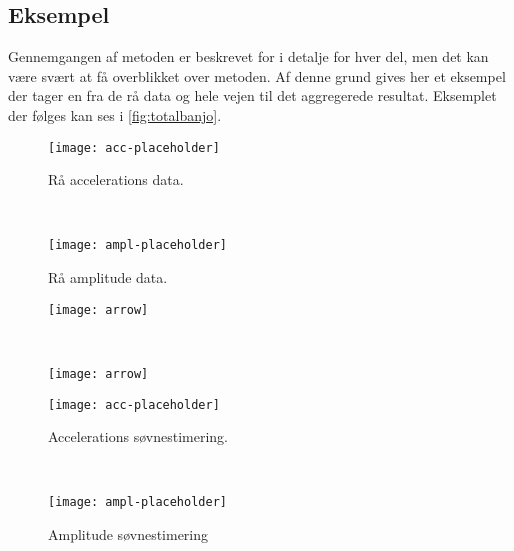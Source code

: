 \subsection{Eksempel}
Gennemgangen af metoden er beskrevet for i detalje for hver del, men det kan være svært at få overblikket over metoden.
Af denne grund gives her et eksempel der tager en fra de rå data og hele vejen til det aggregerede resultat.
Eksemplet der følges kan ses i \cref{fig:totalbanjo}.
\begin{sidewaysfigure}
	\begin{minipage}{0.2\textwidth}
		\begin{subfigure}{\linewidth}
			\centering
			\texttt{[image: acc-placeholder]}
			\caption{Rå accelerations data.}\label{fig:rawaccplot}
		\end{subfigure}\\[5ex]
		\begin{subfigure}{\linewidth}
			\centering
			\texttt{[image: ampl-placeholder]}
			\caption{Rå amplitude data.}\label{fig:rawamplplot}
		\end{subfigure}
	\end{minipage}%
	\begin{minipage}{0.1\textwidth}
		\begin{subfigure}{\linewidth}
			\centering
			\texttt{[image: arrow]}
		\end{subfigure}\\[15ex]
		\begin{subfigure}{\linewidth}
			\centering
			\texttt{[image: arrow]}
		\end{subfigure}
	\end{minipage}%
	\begin{minipage}{0.2\textwidth}
		\begin{subfigure}{\linewidth}
			\centering
			\texttt{[image: acc-placeholder]}
			\caption{Accelerations søvnestimering.}\label{fig:sleepcalcaccplot}
		\end{subfigure}\\[5ex]
		\begin{subfigure}{\linewidth}
			\centering
			\texttt{[image: ampl-placeholder]}
			\caption{Amplitude søvnestimering}\label{fig:sleepcalcamplplot}
		\end{subfigure}
	\end{minipage}%
	\begin{minipage}{0.1\textwidth}

\end{minipage}
\end{sidewaysfigure}
